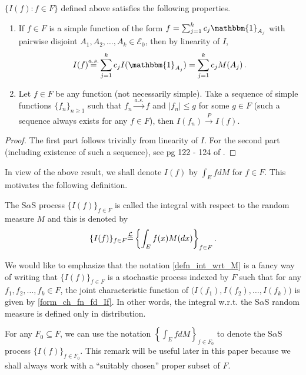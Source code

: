 \documentclass[12pt]{amsart}
\begin{document}
\begin{thm} $\{I(f): f \in F\}$ defined above satisfies the following properties.
\begin{enumerate}
\item If $f \in F$ is a simple function of the form $f=\sum_{j=1}^k c_j \mathbbm{1}_{A_j}$ with pairwise disjoint $A_1, A_2, \ldots, A_k \in \mathcal{E}_0$, then by linearity of $I$,
    \[
    I(f) {\stackrel{a.s.}{=}} \sum_{j=1}^k c_j I(\mathbbm{1}_{A_j}) =  \sum_{j=1}^k c_j M(A_j)\,.
    \]
\item Let $f \in F$ be any function (not necessarily simple). Take a sequence of simple functions $\{f_n\}_{n\geq 1}$ such that $f_n {\stackrel{a.s.}{\longrightarrow}} f$ and $|f_n| \leq g$ for some $g \in F$ (such a sequence always exists for any $f \in F$), then $I(f_n) {\stackrel{P}{\longrightarrow}} I(f)$.
\end{enumerate}
\end{thm}

\begin{proof} The first part follows trivially from linearity of $I$. For the second part (including existence of such a sequence), see pg 122 - 124 of \cite{samorodnitsky:taqqu:1994}.
\end{proof}

In view of the above result, we shall denote $I(f)$ by $\int_E f dM$ for $f \in F$. This motivates the following definition.
\begin{defn}
The S$\alpha$S process $\{I(f)\}_{f \in F}$ is called the integral with respect to the random measure $M$ and this is denoted by
\begin{equation}
\{I(f)\}_{f\in F} {\stackrel{\footnotesize{\mathcal{L}}}{=}} \left\{\int_E f(x) M(dx)\right\}_{f\in F}. \label{defn_int_wrt_M}
\end{equation}
\end{defn}
\noindent We would like to emphasize that the notation \eqref{defn_int_wrt_M} is a fancy way of writing that $\{I(f)\}_{f \in F}$ is a stochastic process indexed by $F$ such that for any $f_1, f_2, \ldots, f_k \in F$, the joint characteristic function of $\big(I(f_1), I(f_2), \ldots, I(f_k)\big)$ is given by \eqref{form_ch_fn_fd_If}. In other words, the integral w.r.t. the S$\alpha$S random measure is defined only in distribution. 

\begin{remark} \label{remark_I_on_F_0} \textnormal{For any $F_0 \subseteq F$, we can use the notation $\left\{\int_E f dM\right\}_{f \in F_0}$ to denote the S$\alpha$S process $\{I(f)\}_{f \in F_0}$. This remark will be useful later in this paper because we shall always work with a ``suitably chosen'' proper subset of $F$.}
\end{remark}
\end{document}
